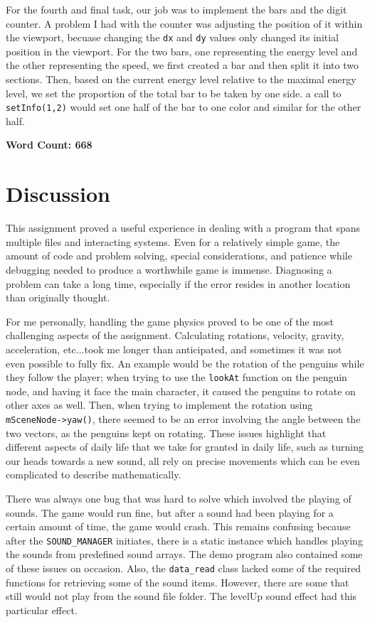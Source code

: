 \documentclass{article}
\begin{document}
	For the fourth and final task, our job was to implement the bars and the digit counter. A problem I had with the counter 
	was adjusting the position of it within the viewport, becuase changing the \texttt{dx} and \texttt{dy} values only  changed
	its initial position in the viewport. For the two bars, one representing the energy level and the other representing the 
	speed, we first created a bar and then split it into two sections. Then, based on the current energy level relative to 
	the maximal energy level, we set the proportion of the total bar to be taken by one side. a call to \texttt{setInfo(1,2)}
	would set one half of the bar to one color and similar for the other half.

	\textbf{Word Count: 668}
\section{Discussion}
	This assignment proved a useful experience in dealing with a program that spans multiple files and interacting systems.
	Even for a relatively simple game, the amount of code and problem solving, special considerations, and patience while
	debugging needed to produce a worthwhile game is immense. Diagnosing a problem can take a long time, especially if the
	error resides in another location than originally thought.  

	For me personally, handling the game physics proved to be one of the most challenging aspects of the assignment.
	Calculating rotations, velocity, gravity, acceleration, etc...took me longer than anticipated, and sometimes it was not
	even possible  to fully fix. An example would be the rotation of the penguins while they follow the player; when trying 
	to use the \texttt{lookAt} function on the penguin node, and having it face the main character, it caused the penguins to 
	rotate on other axes as well. Then, when trying to implement the rotation using \texttt{mSceneNode->yaw()}, there seemed to
	be an error involving the angle between the two vectors, as the penguins kept on rotating. These issues highlight that different
	aspects of daily life that we take for granted in daily life, such as turning our heads towards a new sound, all rely on  precise
	movements which can be even complicated to describe mathematically.
	
	There was always one bug that was hard to solve which involved the playing of sounds. The game would run fine, but after a sound
	had been playing for a certain amount of time, the game would crash. This remains confusing because after the 
	\texttt{SOUND\_MANAGER} initiates, there is a static instance which handles playing the sounds from predefined sound arrays. The
	demo program also contained some of these issues on occasion. Also, the \texttt{data\_read} class lacked some of the required
	functions for retrieving some of the sound items. However, there are some that still would not play from the sound file folder. 
	The levelUp sound effect had this particular effect. 
\end{document}

